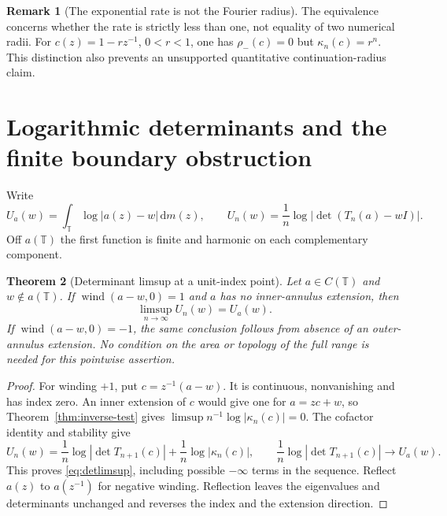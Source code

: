 \documentclass[11pt]{article}
\newtheorem{theorem}{Theorem}[section]
\theoremstyle{definition}
\newtheorem{remark}[theorem]{Remark}
\newcommand{\T}{\mathbb T}
\newcommand{\dd}{\,\mathrm d}
\newcommand{\wind}{\operatorname{wind}}
\begin{document}
\begin{remark}[The exponential rate is not the Fourier radius]
The equivalence concerns whether the rate is strictly less than one, not equality of two numerical radii. For $c(z)=1-rz^{-1}$, $0<r<1$, one has $\rho_-(c)=0$ but $\kappa_n(c)=r^n$. This distinction also prevents an unsupported quantitative continuation-radius claim.
\end{remark}

\section{Logarithmic determinants and the finite boundary obstruction}
Write
\[
 U_a(w)=\int_\T\log|a(z)-w|\dd m(z),\qquad
 U_n(w)=\frac1n\log|\det(T_n(a)-wI)|.
\]
Off $a(\T)$ the first function is finite and harmonic on each complementary component.

\begin{theorem}[Determinant limsup at a unit-index point]\label{thm:limsup}
Let $a\in C(\T)$ and $w\notin a(\T)$.
If $\wind(a-w,0)=1$ and $a$ has no inner-annulus extension, then
\begin{equation}
 \limsup_{n\to\infty}U_n(w)=U_a(w).
 \label{eq:detlimsup}
\end{equation}
If $\wind(a-w,0)=-1$, the same conclusion follows from absence of an outer-annulus extension. No condition on the area or topology of the full range is needed for this pointwise assertion.
\end{theorem}
\begin{proof}
For winding $+1$, put $c=z^{-1}(a-w)$. It is continuous, nonvanishing and has index zero. An inner extension of $c$ would give one for $a=zc+w$, so Theorem~\ref{thm:inverse-test} gives $\limsup n^{-1}\log|\kappa_n(c)|=0$. The cofactor identity and stability give
\[
 U_n(w)=\frac1n\log|\det T_{n+1}(c)|+\frac1n\log|\kappa_n(c)|,
 \qquad \frac1n\log|\det T_{n+1}(c)|\longrightarrow U_a(w).
\]
This proves \eqref{eq:detlimsup}, including possible $-\infty$ terms in the sequence. Reflect $a(z)$ to $a(z^{-1})$ for negative winding. Reflection leaves the eigenvalues and determinants unchanged and reverses the index and the extension direction.
\end{proof}
\end{document}
